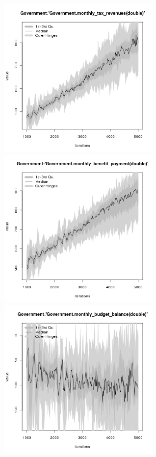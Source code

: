 \begin{figure}[H!]
\centering\leavevmode
\begin{minipage}{17cm}
\centering\leavevmode
\includegraphics[width=8cm]{./png/tax_0.10/Government-monthly_tax_revenues.png}
\includegraphics[width=8cm]{./png/tax_0.10/Government-monthly_benefit_payment.png}\\
\includegraphics[width=8cm]{./png/tax_0.10/Government-monthly_budget_balance.png}

\end{minipage}
\end{figure}

